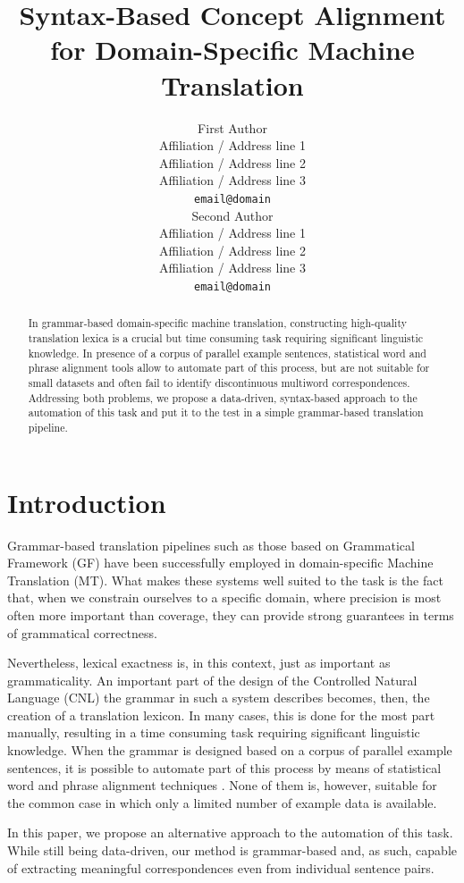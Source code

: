 \documentclass[11pt]{article}
\title{Syntax-Based Concept Alignment for Domain-Specific Machine Translation}
\author{First Author \\
  Affiliation / Address line 1 \\
  Affiliation / Address line 2 \\
  Affiliation / Address line 3 \\
  \texttt{email@domain} \\\And
  Second Author \\
  Affiliation / Address line 1 \\
  Affiliation / Address line 2 \\
  Affiliation / Address line 3 \\
  \texttt{email@domain} \\}
\begin{document}
\maketitle
\begin{abstract}
In grammar-based domain-specific machine translation, constructing high-quality translation lexica is a crucial but time consuming task requiring significant linguistic knowledge. 
In presence of a corpus of parallel example sentences, statistical word and phrase alignment tools allow to automate part of this process, but are not suitable for small datasets and often fail to identify discontinuous multiword correspondences. 
Addressing both problems, we propose a data-driven, syntax-based approach to the automation of this task and put it to the test in a simple grammar-based translation pipeline.
\end{abstract}

\section{Introduction}
Grammar-based translation pipelines such as those based on Grammatical Framework (GF) \cite{dummy} have been successfully employed in domain-specific Machine Translation (MT).  
What makes these systems well suited to the task is the fact that, when we constrain ourselves to a specific domain, where precision is most often more important than coverage, they can provide strong guarantees in terms of grammatical correctness. 

Nevertheless, lexical exactness is, in this context, just as important as grammaticality. 
An important part of the design of the Controlled Natural Language (CNL) the grammar in such a system describes becomes, then, the creation of a translation lexicon. 
In many cases, this is done for the most part manually, resulting in a time consuming task requiring significant linguistic knowledge. 
When the grammar is designed based on a corpus of parallel example sentences, it is possible to automate part of this process by means of statistical word and phrase alignment techniques \cite{dummy}. 
None of them is, however, suitable for the common case in which only a limited number of example data is available.

In this paper, we propose an alternative approach to the automation of this task. 
While still being data-driven, our method is grammar-based and, as such, capable of extracting meaningful correspondences even from individual sentence pairs. 
\end{document}
